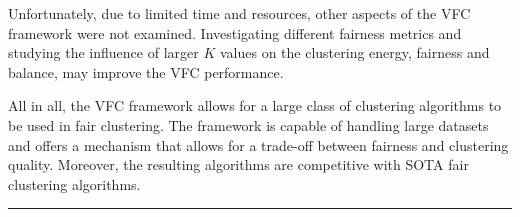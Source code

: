 Unfortunately, due to limited time and resources, other aspects of the VFC framework were not examined. Investigating different fairness metrics and studying the influence of larger $K$ values on the clustering energy, fairness and balance, may improve the VFC performance.


All in all, the VFC framework allows for a large class of clustering algorithms to be used in fair clustering. The framework is capable of handling large datasets and offers a mechanism that allows for a trade-off between fairness and clustering quality. Moreover, the resulting algorithms are competitive with SOTA fair clustering algorithms.

\vspace*{\fill}
\hrule
